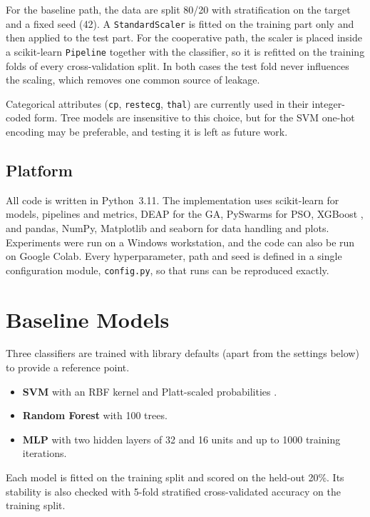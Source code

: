 \documentclass[MTech]{ugthesis}
\begin{document}
For the baseline path, the data are split 80/20 with stratification on the target and a fixed seed (42). A \texttt{StandardScaler} is fitted on the training part only and then applied to the test part. For the cooperative path, the scaler is placed inside a scikit-learn \texttt{Pipeline} together with the classifier, so it is refitted on the training folds of every cross-validation split. In both cases the test fold never influences the scaling, which removes one common source of leakage.

Categorical attributes (\texttt{cp}, \texttt{restecg}, \texttt{thal}) are currently used in their integer-coded form. Tree models are insensitive to this choice, but for the SVM one-hot encoding may be preferable, and testing it is left as future work.

\subsection{Platform}
All code is written in Python~3.11. The implementation uses scikit-learn \citep{pedregosa2011sklearn} for models, pipelines and metrics, DEAP \citep{fortin2012deap} for the GA, PySwarms \citep{miranda2018pyswarms} for PSO, XGBoost \citep{chen2016xgboost}, and pandas, NumPy, Matplotlib and seaborn for data handling and plots. Experiments were run on a Windows workstation, and the code can also be run on Google Colab. Every hyperparameter, path and seed is defined in a single configuration module, \texttt{config.py}, so that runs can be reproduced exactly.

\section{Baseline Models}
Three classifiers are trained with library defaults (apart from the settings below) to provide a reference point.
\begin{itemize}
\item \textbf{SVM} \citep{cortes1995svm} with an RBF kernel and Platt-scaled probabilities \citep{platt1999probabilistic}.
\item \textbf{Random Forest} \citep{breiman2001rf} with 100 trees.
\item \textbf{MLP} \citep{rumelhart1986backprop} with two hidden layers of 32 and 16 units and up to 1000 training iterations.
\end{itemize}
Each model is fitted on the training split and scored on the held-out 20\%. Its stability is also checked with 5-fold stratified cross-validated accuracy on the training split.
\end{document}

